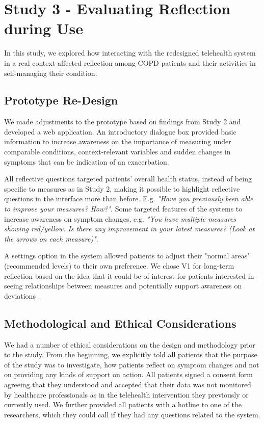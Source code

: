 \section{Study 3 - Evaluating Reflection during Use} 
In this study, we explored how interacting with the redesigned telehealth system in a real context affected reflection among COPD patients and their activities in self-managing their condition. 

\subsection{Prototype Re-Design}
We made adjustments to the prototype based on findings from Study 2 and developed a web application. An introductory dialogue box provided basic information to increase awareness on the importance of measuring under comparable conditions, context-relevant variables and sudden changes in symptoms that can be indication of an exacerbation. 

All reflective questions targeted patients' overall health status, instead of being specific to measures as in Study 2, making it possible to highlight reflective questions in the interface more than before. E.g. \textit{"Have you previously been able to improve your measures? How?"}. Some targeted features of the systems to increase awareness on symptom changes, e.g. \textit{"You have multiple measures showing red/yellow. Is there any improvement in your latest measures? (Look at the arrows on each measure)"}. 

A settings option in the system allowed patients to adjust their "normal areas" (recommended levels) to their own preference. We chose V1 for long-term reflection based on the idea that it could be of interest for patients interested in seeing relationships between measures and potentially support awareness on deviations \cite{Rivera, Cuttone}. 

\subsection{Methodological and Ethical Considerations}
We had a number of ethical considerations on the design and methodology prior to the study. From the beginning, we explicitly told all patients that the purpose of the study was to investigate, how patients reflect on symptom changes and not on providing any kinds of support on action. All patients signed a consent form agreeing that they understood and accepted that their data was not monitored by healthcare professionals as in the telehealth intervention they previously or currently used. We further provided all patients with a hotline to one of the researchers, which they could call if they had any questions related to the system.

